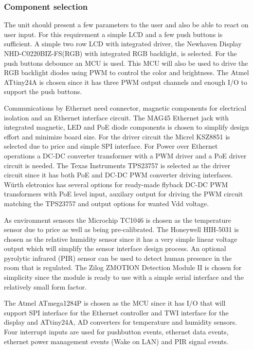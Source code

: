 
\subsubsection{Component selection}
The unit should present a few parameters to the user and also be able
to react on user input. For this requirement a simple LCD and a few
push buttons is sufficient. A simple two row LCD with integrated
driver, the Newhaven Display NHD-C0220BIZ-FS(RGB) with integrated RGB
backlight, is selected. For the push buttons debounce an MCU is
used. This MCU will also be used to drive the RGB backlight diodes
using PWM to control the color and brightness. The Atmel ATtiny24A is
chosen since it has three PWM output channels and enough I/O to
support the push buttons.

Communications by Ethernet need connector, magnetic components for
electrical isolation and an Ethernet interface circuit. The MAG45
Ethernet jack with integrated magnetic, LED and PoE diode components
is chosen to simplify design effort and minimize board size. For the
driver circuit the Micrel KSZ8851 is selected due to price and simple
SPI interface. For Power over Ethernet operations a DC-DC converter
transformer with a PWM driver and a PoE driver circuit is needed. The
Texas Instruments TPS23757 is selected as the driver circuit since it
has both PoE and DC-DC PWM converter driving interfaces. Würth
eletronics has several options for ready-made flyback DC-DC PWM
transformers with PoE level input, auxilary output for driving the PWM
circuit matching the TPS23757 and output options for wanted Vdd
voltage.

As environment sensors the Microchip TC1046 is chosen as the
temperature sensor due to price as well as being pre-calibrated. The
Honeywell HIH-5031 is chosen as the relative humidity sensor since it
has a very simple linear voltage output which will simplify the sensor
interface design process. An optional pyrolytic infrared (PIR) sensor
can be used to detect human presence in the room that is
regulated. The Zilog ZMOTION Detection Module II is chosen for
simplicity since the module is ready to use with a simple serial
interface and the relatively small form factor.

The Atmel ATmega1284P is chosen as the MCU since it has I/O that will
support SPI interface for the Ethernet controller and TWI interface
for the display and ATtiny24A, AD converters for temperature and
humidity sensors. Four interrupt inputs are used for pushbutton
events, ethernet data events, ethernet power management events (Wake
on LAN) and PIR signal events.

